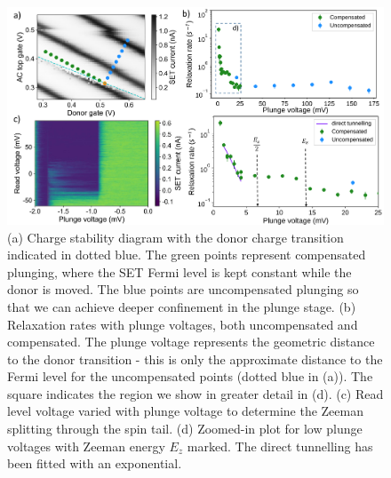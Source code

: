 \documentclass[%
 reprint,
 amsmath,amssymb,
 aps,
]{revtex4-1}
\begin{document}
\begin{figure}
\centering
\includegraphics[width=1.4\columnwidth]{figures/fig5.pdf}
\caption{
(a) Charge stability diagram with the donor charge transition indicated in dotted blue. The green points represent compensated plunging, where the SET Fermi level is kept constant while the donor is moved. The blue points are uncompensated plunging so that we can achieve deeper confinement in the plunge stage. (b) Relaxation rates with plunge voltages, both uncompensated and compensated. The plunge voltage represents the geometric distance to the donor transition - this is only the approximate distance to the Fermi level for the uncompensated points (dotted blue in (a)). The square indicates the region we show in greater detail in (d). (c) Read level voltage varied with plunge voltage to determine the Zeeman splitting through the spin tail. (d) Zoomed-in plot for low plunge voltages with Zeeman energy $E_z$ marked. The direct tunnelling has been fitted with an exponential. 
}
\label{fig:plungedependence}
\end{figure}
\end{document}
